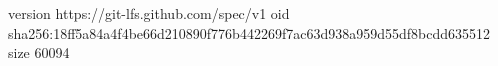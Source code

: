 version https://git-lfs.github.com/spec/v1
oid sha256:18ff5a84a4f4be66d210890f776b442269f7ac63d938a959d55df8bcdd635512
size 60094
